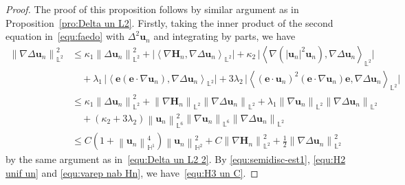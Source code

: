 \documentclass[11pt, reqno]{amsart}
\theoremstyle{definition}
\numberwithin{equation}{section}
\newcommand{\bff}{\boldsymbol}
\newcommand{\bb}{\mathbb}
\newcommand{\norm}[2]{\left\|{#1}\right\|_{#2}}
\newcommand{\inpro}[2]{\left\langle#1,#2\right\rangle}
\begin{document}
\begin{proof}
The proof of this proposition follows by similar argument as in Proposition~\ref{pro:Delta un L2}.
Firstly, taking the inner product of the second equation in~\eqref{equ:faedo} with $\Delta^2 \bff{u}_n$ and integrating by parts, we have
\begin{align}\label{equ:norm H3 un2}
    \norm{\nabla \Delta \bff{u}_n}{\bb{L}^2}^2
    &\leq
    \kappa_1 \norm{\Delta \bff{u}_n}{\bb{L}^2}^2
    +
    \Big| \inpro{\nabla \bff{H}_n}{\nabla\Delta \bff{u}_n}_{\bb{L}^2} \Big|
    +
    \kappa_2 \,\Big| \inpro{\nabla (|\bff{u}_n|^2 \bff{u}_n)}{\nabla \Delta \bff{u}_n}_{\bb{L}^2} \Big|
    \nonumber\\
    &\quad
    +
    \lambda_1 \,\Big| \inpro{\bff{e}(\bff{e}\cdot \nabla \bff{u}_n)}{\nabla \Delta \bff{u}_n}_{\bb{L}^2} \Big|
    +
    3\lambda_2 \,\Big| \inpro{(\bff{e}\cdot\bff{u}_n)^2 (\bff{e}\cdot \nabla \bff{u}_n) \bff{e}}{\nabla \Delta \bff{u}_n}_{\bb{L}^2} \Big|
    \nonumber\\
    &\leq
    \kappa_1 \norm{\Delta \bff{u}_n}{\bb{L}^2}^2
    +
    \norm{\nabla \bff{H}_n}{\bb{L}^2} \norm{\nabla \Delta \bff{u}_n}{\bb{L}^2}
    +
    \lambda_1 \norm{\nabla \bff{u}_n}{\bb{L}^2} \norm{\nabla\Delta\bff{u}_n}{\bb{L}^2}
    \nonumber\\
    &\quad
    +
    (\kappa_2+3\lambda_2) \norm{\bff{u}_n}{\bb{L}^6}^2 \norm{\nabla \bff{u}_n}{\bb{L}^6} \norm{\nabla \Delta \bff{u}_n}{\bb{L}^2}
    \nonumber\\
    &\leq
    C\left(1+\norm{\bff{u}_n}{\bb{H}^1}^4\right) \norm{\bff{u}_n}{\bb{H}^2}^2
    +
    C\norm{\nabla \bff{H}_n}{\bb{L}^2}^2
    +
    \frac12 \norm{\nabla \Delta \bff{u}_n}{\bb{L}^2}^2
\end{align}
by the same argument as in~\eqref{equ:Delta un L2 2}. By \eqref{equ:semidisc-est1}, \eqref{equ:H2 unif un} and \eqref{equ:varep nab Hn}, we have~\eqref{equ:H3 un C}.


\end{proof}
\end{document}
